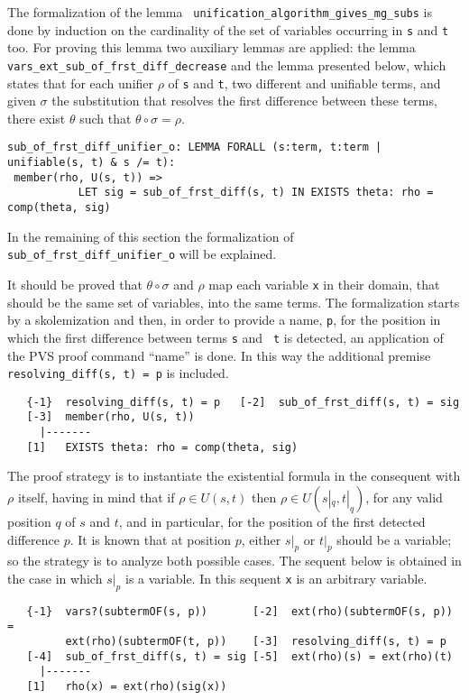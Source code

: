 \documentclass[submission,copyright,creativecommons]{eptcs}
\begin{document}
The formalization of the lemma {\tt
  unification\_algorithm\_gives\_mg\_subs} is done by induction on the
cardinality of the set of variables occurring in {\tt s} and {\tt t}
too. For proving this lemma two auxiliary lemmas are applied: the
lemma {\tt vars\_ext\_sub\_of\_frst\_diff\_decrease} and the lemma
presented below, which states that for each unifier $\rho$ of {\tt s}
and {\tt t}, two different and unifiable terms, and given $\sigma$ the
substitution that resolves the first difference between these terms,
there exist $\theta$ such that $\theta\circ\sigma = \rho$.
                
{\small
\begin{verbatim}
sub_of_frst_diff_unifier_o: LEMMA FORALL (s:term, t:term | unifiable(s, t) & s /= t):
 member(rho, U(s, t)) =>
           LET sig = sub_of_frst_diff(s, t) IN EXISTS theta: rho = comp(theta, sig)
\end{verbatim}
}

In the remaining of this section the formalization of {\tt
  sub\_of\_frst\_diff\_unifier\_o} will be explained.

It should be proved that $\theta \circ \sigma$ and $\rho$ map each
variable {\tt x} in their domain, that should be the same set of
variables, into the same terms.  The formalization starts by a
skolemization and then, in order to provide a name, {\tt p}, for the
position in which the first difference between terms {\tt s} and {\tt
  t} is detected, an application of the PVS proof command ``name'' is
done. In this way the additional premise {\tt resolving\_diff(s, t) =
  p} is included.

{\small
\begin{verbatim}
   {-1}  resolving_diff(s, t) = p   [-2]  sub_of_frst_diff(s, t) = sig
   [-3]  member(rho, U(s, t))
     |-------
   [1]   EXISTS theta: rho = comp(theta, sig)
\end{verbatim}
}

The proof strategy is to instantiate the existential formula in the
consequent with $\rho$ itself, having in mind that if $\rho \in U(s,
t)$ then $\rho \in U(s|_q, t|_q)$, for any valid position $q$ of $s$
and $t$, and in particular, for the position of the first detected
difference $p$. It is known that at position $p$, either $s|_p$ or
$t|_p$ should be a variable; so the strategy is to analyze both
possible cases. The sequent below is obtained in the case in which
$s|_p$ is a variable. In this sequent {\tt x} is an arbitrary
variable.

{\small
\begin{verbatim}
   {-1}  vars?(subtermOF(s, p))       [-2]  ext(rho)(subtermOF(s, p)) = 
         ext(rho)(subtermOF(t, p))    [-3]  resolving_diff(s, t) = p   
   [-4]  sub_of_frst_diff(s, t) = sig [-5]  ext(rho)(s) = ext(rho)(t)
     |-------
   [1]   rho(x) = ext(rho)(sig(x))
\end{verbatim}
}
\end{document}
